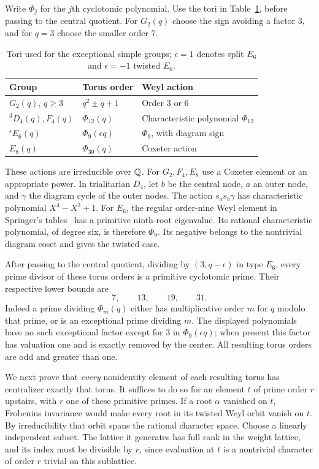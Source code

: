 Write $\Phi_j$ for the $j$th cyclotomic polynomial. Use the tori
in Table~\ref{fg:table-exceptional-tori}, before passing to the
central quotient. For $G_2(q)$ choose the sign avoiding a factor
$3$, and for $q=3$ choose the smaller order $7$.
\begin{table}[htbp]
\centering
\begin{tabular}{lll}
\toprule
Group & Torus order & Weyl action\\
\midrule
$G_2(q)$, $q\ge3$ & $q^2\pm q+1$ & Order $3$ or $6$\\
${}^3D_4(q),F_4(q)$ & $\Phi_{12}(q)$ & Characteristic polynomial $\Phi_{12}$\\
${}^{\epsilon}E_6(q)$ & $\Phi_9(\epsilon q)$ & $\Phi_9$, with diagram sign\\
$E_8(q)$ & $\Phi_{30}(q)$ & Coxeter action\\
\bottomrule
\end{tabular}
\caption{Tori used for the exceptional simple groups;
$\epsilon=1$ denotes split $E_6$ and $\epsilon=-1$ twisted $E_6$.}
\label{fg:table-exceptional-tori}
\end{table}

These actions are irreducible over $\mathbb Q$. For $G_2,F_4,E_8$ use
a Coxeter element or an appropriate power. In trialitarian $D_4$,
let $b$ be the central node, $a$ an outer node, and $\gamma$ the
diagram cycle of the outer nodes. The action $s_a s_b\gamma$ has
characteristic polynomial $X^4-X^2+1$. For $E_6$, the regular
order-nine Weyl element in Springer's
tables~\cite[Section 5.4, Table 1]{Springer} has
a primitive ninth-root eigenvalue. Its rational characteristic
polynomial, of degree six, is therefore $\Phi_9$. Its negative
belongs to the nontrivial diagram coset and gives the twisted
case.

After passing to the central quotient, dividing by $(3,q-\epsilon)$
in type $E_6$, every prime divisor of these torus orders is a
primitive cyclotomic prime. Their respective lower bounds are
\[
 7,\qquad13,\qquad19,\qquad31.
\]
Indeed a prime dividing $\Phi_m(q)$ either has multiplicative
order $m$ for $q$ modulo that prime, or is an exceptional prime
dividing $m$. The displayed polynomials have no such exceptional
factor except for $3$ in $\Phi_9(\epsilon q)$; when present this
factor has valuation one and is exactly removed by the center.
All resulting torus orders are odd and greater than one.

We next prove that \emph{every} nonidentity element of each resulting
torus has centralizer exactly that torus. It suffices to do so for
an element $t$ of prime order $r$ upstairs, with $r$ one of these
primitive primes. If a root $\alpha$ vanished on $t$, Frobenius
invariance would make every root in its twisted Weyl orbit vanish
on $t$. By irreducibility that orbit spans the rational character
space. Choose a linearly independent subset. The lattice it
generates has full rank in the weight lattice, and its index must
be divisible by $r$, since evaluation at $t$ is a nontrivial
character of order $r$ trivial on this sublattice.

